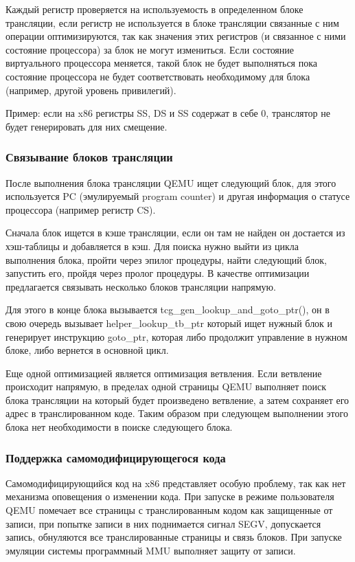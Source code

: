 Каждый регистр проверяется на используемость в определенном блоке трансляции, если регистр не используется в блоке трансляции связанные с ним операции оптимизируются, так как значения этих регистров (и связанное с ними состояние процессора) за блок не могут измениться. Если состояние виртуального процессора меняется, такой блок не будет выполняться пока состояние процессора не будет соответствовать необходимому для блока (например, другой уровень привилегий).

Пример: если на x86 регистры SS, DS и SS содержат в себе 0, транслятор не будет генерировать для них смещение.

\subsubsection{Связывание блоков трансляции}

После выполнения блока трансляции QEMU ищет следующий блок, для этого используется PC (эмулируемый program counter) и другая информация о статусе процессора (например регистр CS).

Сначала блок ищется в кэше трансляции, если он там не найден он достается из хэш-таблицы и добавляется в кэш. Для поиска нужно выйти из цикла выполнения блока, пройти через эпилог процедуры, найти следующий блок, запустить его, пройдя через пролог процедуры. В качестве оптимизации предлагается связывать несколько блоков трансляции напрямую.

Для этого в конце блока вызывается tcg\_gen\_lookup\_and\_goto\_ptr(), он в свою очередь вызывает helper\_lookup\_tb\_ptr который ищет нужный блок и генерирует инструкцию goto\_ptr, которая либо продолжит управление в нужном блоке, либо вернется в основной цикл.

Еще одной оптимизацией является оптимизация ветвления. Если ветвление происходит напрямую, в пределах одной страницы QEMU выполняет поиск блока трансляции на который будет произведено ветвление, а затем сохраняет его адрес в транслированном коде. Таким образом при следующем выполнении этого блока нет необходимости в поиске следующего блока.

\subsubsection{Поддержка самомодифицирующегося кода}

Самомодифицирующийся код на x86 представляет особую проблему, так как нет механизма оповещения о изменении кода. При запуске в режиме пользователя QEMU помечает все страницы с транслированным кодом как защищенные от записи, при попытке записи в них поднимается сигнал SEGV, допускается запись, обнуляются все транслированные страницы и связь блоков. При запуске эмуляции системы программный MMU выполняет защиту от записи.

